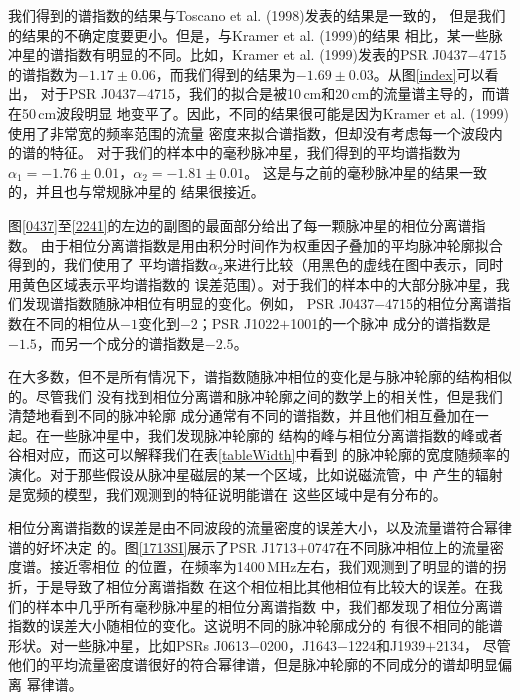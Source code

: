 我们得到的谱指数的结果与Toscano et al. (1998)\supercite{Toscano98}发表的结果是一致的，
但是我们的结果的不确定度要更小。但是，与Kramer et al. (1999)\supercite{Kramer99}的结果
相比，某一些脉冲星的谱指数有明显的不同。比如，Kramer et al. (1999)发表的PSR J0437$-$4715
的谱指数为$-1.17\pm0.06$，而我们得到的结果为$-1.69\pm0.03$。从图\ref{index}可以看出，
对于PSR J0437$-$4715，我们的拟合是被10\,cm和20\,cm的流量谱主导的，而谱在50\,cm波段明显
地变平了。因此，不同的结果很可能是因为Kramer et al. (1999)使用了非常宽的频率范围的流量
密度来拟合谱指数，但却没有考虑每一个波段内的谱的特征。
%
对于我们的样本中的毫秒脉冲星，我们得到的平均谱指数为$\alpha_1=-1.76\pm0.01$，$\alpha_2=-1.81\pm0.01$。
这是与之前的毫秒脉冲星的结果一致的\supercite{Toscano98,Kramer99}，并且也与常规脉冲星的
结果很接近\supercite{Lorimer95,Maron00}。

图\ref{0437}至\ref{2241}的左边的副图的最面部分给出了每一颗脉冲星的相位分离谱指数。
由于相位分离谱指数是用由积分时间作为权重因子叠加的平均脉冲轮廓拟合得到的，我们使用了
平均谱指数$\alpha_2$来进行比较（用黑色的虚线在图中表示，同时用黄色区域表示平均谱指数的
误差范围）。对于我们的样本中的大部分脉冲星，我们发现谱指数随脉冲相位有明显的变化。例如，
PSR J0437$-$4715的相位分离谱指数在不同的相位从$-1$变化到$-2$；PSR J1022$+$1001的一个脉冲
成分的谱指数是$-1.5$，而另一个成分的谱指数是$-2.5$。

在大多数，但不是所有情况下，谱指数随脉冲相位的变化是与脉冲轮廓的结构相似的。尽管我们
没有找到相位分离谱和脉冲轮廓之间的数学上的相关性，但是我们清楚地看到不同的脉冲轮廓
成分通常有不同的谱指数，并且他们相互叠加在一起。在一些脉冲星中，我们发现脉冲轮廓的
结构的峰与相位分离谱指数的峰或者谷相对应，而这可以解释我们在表\ref{tableWidth}中看到
的脉冲轮廓的宽度随频率的演化。对于那些假设从脉冲星磁层的某一个区域，比如说磁流管，中
产生的辐射是宽频的模型\supercite{Michel87,Dyks10,Wang14}，我们观测到的特征说明能谱在
这些区域中是有分布的。

相位分离谱指数的误差是由不同波段的流量密度的误差大小，以及流量谱符合幂律谱的好坏决定
的。图\ref{1713SI}展示了PSR J1713$+$0747在不同脉冲相位上的流量密度谱。接近零相位
的位置，在频率为1400\,MHz左右，我们观测到了明显的谱的拐折，于是导致了相位分离谱指数
在这个相位相比其他相位有比较大的误差。在我们的样本中几乎所有毫秒脉冲星的相位分离谱指数
中，我们都发现了相位分离谱指数的误差大小随相位的变化。这说明不同的脉冲轮廓成分的
有很不相同的能谱形状。对一些脉冲星，比如PSRs J0613$-$0200，J1643$-$1224和J1939$+$2134，
尽管他们的平均流量密度谱很好的符合幂律谱，但是脉冲轮廓的不同成分的谱却明显偏离
幂律谱。

